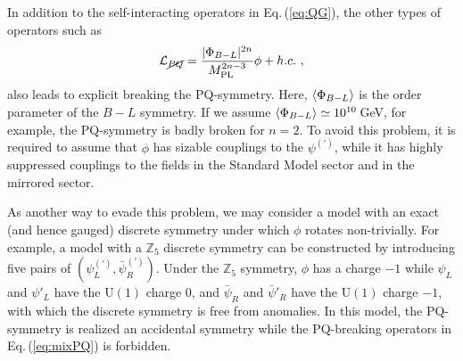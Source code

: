 \documentclass[aps,amsmath,preprint,epsf,superscriptaddress,nofootinbib,notitlepage]{revtex4-1}
\begin{document}
In addition to the self-interacting operators in Eq.\,(\ref{eq:QG}), the other types of operators such as
\begin{eqnarray}
\label{eq:mixPQ}
{\cal L}_{\cancel{PQ}} = \frac{|\Phi_{B-L}|^{2n}}{M_{\rm PL}^{2n-3}} \phi + h.c. \ ,
\end{eqnarray}
also leads to explicit breaking the PQ-symmetry. 
Here, $\left\langle {\Phi_{B-L}} \right\rangle$ is the order parameter of the $B-L$ symmetry.
If we assume $\left\langle {\Phi_{B-L}} \right\rangle \simeq 10^{10}$\,GeV, for example, 
the PQ-symmetry is badly broken for $n=2$.
To avoid this problem, it is required  to assume that  $\phi$ has
sizable couplings to the $\psi^{(\prime)}$, while it has highly suppressed couplings to the fields in the Standard Model sector and in the mirrored sector.

As another way to evade this problem, we may consider a model with an exact (and hence gauged) discrete symmetry under which $\phi$ rotates non-trivially.
For example, a model with a ${\mathbb Z}_5$ discrete symmetry can be constructed 
by introducing five pairs of $(\psi_L^{(\prime)},\bar\psi_R^{(\prime)})$. 
Under the ${\mathbb Z}_5$ symmetry, $\phi$ has a charge $-1$ while $\psi_L$ and $\psi'_L$ have the $\text{U}(1)$ charge $0$, 
and $\bar \psi_R$ and $\bar\psi'_R$ have the $\text{U}(1)$ charge $-1$, with which the discrete symmetry is free from anomalies.
In this model, the PQ-symmetry is realized an accidental symmetry while the PQ-breaking operators in Eq.\,(\ref{eq:mixPQ}) is forbidden.
\end{document}
